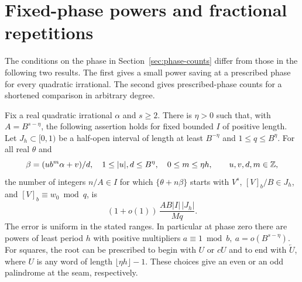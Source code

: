 \section{Fixed-phase powers and fractional repetitions}
\label{sec:fixed-phase}

The conditions on the phase in Section~\ref{sec:phase-counts}
differ from those in the following two results. The first gives a
small power saving at a prescribed phase for every quadratic
irrational. The second gives prescribed-phase counts for a
shortened comparison in arbitrary degree.

\begin{theorem}\label{thm:fixed-quad}
Fix a real quadratic irrational \(\alpha\) and \(s\ge2\).
There is \(\eta>0\) such that, with \(A=B^{s-\eta}\), the
following assertion holds for fixed bounded \(I\) of positive
length. Let \(J_h\subset[0,1)\) be a half-open interval of length
at least \(B^{-\eta}\) and \(1\le q\le B^\eta\). For all real
\(\theta\) and
\[
 \beta=(u b^m\alpha+v)/d,\quad
 1\le |u|,d\le B^\eta,\quad 0\le m\le\eta h,
 \qquad u,v,d,m\in\mathbb Z,
\]
the number of integers \(n/A\in I\) for which \(\{\theta+n\beta\}\)
starts with \(V^s\), \([V]_b/B\in J_h\), and
\([V]_b\equiv w_0\bmod q\), is
\[
 (1+o(1))\, \frac{AB |I|\,|J_h|}{M q}.
\]
The error is uniform in the stated ranges. In particular at phase
zero there are powers of least period \(h\) with positive multipliers
\(a\equiv1\bmod b,\ a=o(B^{s-\eta})\). For squares, the root can be
prescribed to begin with \(U\) or \(cU\) and to end with
\(\overleftarrow U\), where \(U\) is any word of length
\(\lfloor\eta h\rfloor-1\). These choices give an even or an odd
palindrome at the seam, respectively.
\end{theorem}

